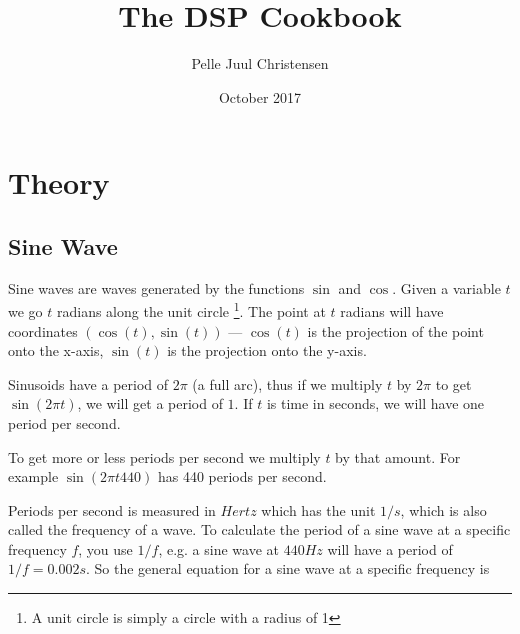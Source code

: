 \documentclass[openany]{book}
\begin{document}
\title{The DSP Cookbook}
\date{October 2017}
\author{Pelle Juul Christensen}
\maketitle
\tableofcontents

\chapter{Theory}
\section{Sine Wave}
Sine waves are waves generated by the functions $\sin$ and $\cos$. Given a variable $t$ we go $t$ radians along the unit circle \footnote{A unit circle is simply a circle with a radius of 1}. The point at $t$ radians will have coordinates $(\cos(t), \sin(t))$ --- $\cos(t)$ is the projection of the point onto the x-axis, $\sin(t)$ is the projection onto the y-axis.



\begin{figure}[h]
\centering
{}
\end{figure}

Sinusoids have a period of $2 \pi$ (a full arc), thus if we multiply $t$ by $2\pi$ to get $\sin(2 \pi t)$, we will get a period of $1$. If $t$ is time in seconds, we will have one period per second.

To get more or less periods per second we multiply $t$ by that amount. For example $\sin(2 \pi t 440)$ has 440 periods per second.

Periods per second is measured in $Hertz$ which has the unit $1/s$, which is also called the frequency of a wave. To calculate the period of a sine wave at a specific frequency $f$, you use $1/f$, e.g. a sine wave at $440Hz$ will have a period of $1/f=0.002s$. So the general equation for a sine wave at a specific frequency is
\end{document}

